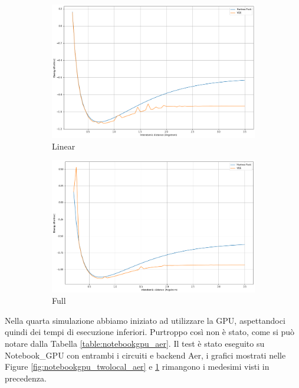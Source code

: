 \begin{figure}[t]
    \begin{subfigure}[h]{0.49\linewidth}
        \includegraphics[width=\linewidth]{Images/Capitolo3/Plots/H2_efficientsu2_linear_aer_gpu_plot.png}
        \caption{Linear}
    \end{subfigure}
    \hfill
    \begin{subfigure}[h]{0.49\linewidth}
        \includegraphics[width=\linewidth]{Images/Capitolo3/Plots/H2_efficientsu2_full_aer_gpu_plot.png}
        \caption{Full}
    \end{subfigure}%
    \caption[Grafico 6 \newline EfficientSU2 - L\_BFGS\_B - Notebook\_GPU - Aer.]{}
    \label{fig:notebookgpu_efficientsu2_aer}
\end{figure}
\newline\newline
Nella quarta simulazione abbiamo iniziato ad utilizzare la GPU, aspettandoci quindi dei tempi di esecuzione inferiori.
Purtroppo così non è stato, come si può notare dalla Tabella \ref{table:notebookgpu_aer}.
Il test è stato eseguito su Notebook\_GPU con entrambi i circuiti e backend Aer, i grafici mostrati nelle Figure \ref{fig:notebookgpu_twolocal_aer} e \ref{fig:notebookgpu_efficientsu2_aer} rimangono i medesimi visti in precedenza.

